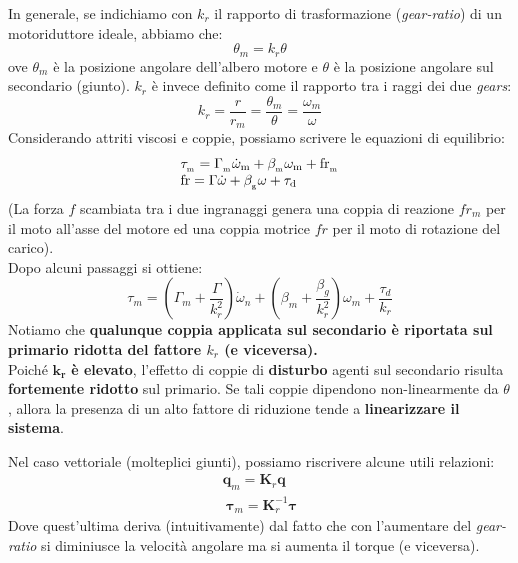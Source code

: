 In generale, se indichiamo con $k_r$ il rapporto di trasformazione (\textit{gear-ratio}) di un motoriduttore ideale, abbiamo che:
$$
\theta_m = k_r\theta
$$
ove $\theta_m$ è la posizione angolare dell’albero motore e $\theta$ è la posizione angolare sul secondario (giunto). $k_r$ è invece definito come il rapporto tra i raggi dei due \textit{gears}:
$$
k_r = \frac{r}{r_m} = \frac{\theta_m}{\theta} = \frac{\omega_m}{\omega}
$$
Considerando attriti viscosi e coppie, possiamo scrivere le equazioni di equilibrio:
$$
\begin{array}{l c r}
	{\tau_{_\mathrm{m}}=\Gamma_{_\mathrm{m}}\dot{\omega}_{\mathrm{m}}+\beta_{_\mathrm{m}}\omega_{\mathrm{m}}+\mathrm{fr}_{_{\mathrm{m}}}}\\ {\mathrm{fr}=\Gamma\dot{\omega}+\beta_{_\mathrm{g}}\omega+\tau_{\mathrm{d}}}
\end{array}
$$
(La forza $f$ scambiata tra i due ingranaggi genera una coppia di reazione $fr_m$ per il moto all'asse del motore ed una coppia motrice $fr$ per il moto di rotazione del carico).\\
Dopo alcuni passaggi si ottiene:
$$
\tau_m = \left( \Gamma_m + \frac{\Gamma}{k_r^2} \right) \dot{\omega}_n
+
\left( \beta_m + \frac{\beta_g}{k_r^2} \right)\omega_m
+
\frac{\tau_d}{k_r}
$$
Notiamo che \textbf{qualunque coppia applicata sul secondario è riportata sul primario ridotta del fattore $k_r$ (e viceversa).} \\
Poiché $\mathbf{k_r}$ \textbf{è elevato}, l’effetto di coppie di \textbf{disturbo} agenti sul secondario risulta \textbf{fortemente ridotto} sul primario. Se tali coppie dipendono non-linearmente da $\theta$, allora la presenza di un alto fattore di riduzione tende a \textbf{linearizzare il sistema}.

Nel caso vettoriale (molteplici giunti), possiamo riscrivere alcune utili relazioni:
\begin{align}
	\mathbf{q}_m = \mathbf{K}_r\mathbf{q} \label{eq:trasmission_reduction}\\\
	\boldsymbol{\tau}_m = \mathbf{K}_r^{-1} \boldsymbol{\tau} \label{eq:trasmission_reduction_torque}
\end{align}
Dove quest'ultima deriva (intuitivamente) dal fatto che con l'aumentare del \textit{gear-ratio} si diminiusce la velocità angolare ma si aumenta il torque (e viceversa).




